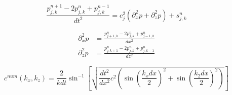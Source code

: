 \documentclass[a4paper,12pt]{article}
\theoremstyle{plain} %
\theoremstyle{remark} %
\begin{document}
$$
\frac{p_{j, k}^{n+1}-2 p_{j, k}^{n}+p_{j, k}^{n-1}}{d t^{2}}=c_{j}^{2}\left(\partial_{x}^{2} p+\partial_{z}^{2} p\right)+s_{j, k}^{n}
$$


$$
\begin{aligned} \partial_{x}^{2} p &=\frac{p_{j+1, k}^{n}-2 p_{j, k}^{n}+p_{j-1, k}^{n}}{d x^{2}} \\ \partial_{z}^{2} p &=\frac{p_{j, k+1}^{n}-2 p_{j, k}^{n}+p_{j, k-1}^{n}}{d z^{2}} \end{aligned}
$$


$$
c^{n u m}\left(k_{x} , k_{z}\right)=\frac{2}{k d t} \sin ^{-1}\left[\sqrt{\frac{d t^{2}}{d x^{2}} c^{2}\left(\sin \left(\frac{k_{x} d x}{2}\right)^2+\sin \left(\frac{k_{2} d x}{2}\right)^2\right)}\right]
$$
\end{document}

